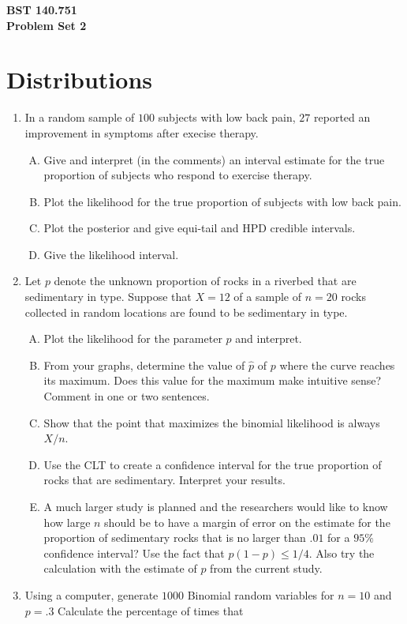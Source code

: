 \documentclass[12pt]{article}
\begin{document}
\noindent
{\bf BST 140.751 \\ Problem Set 2} \\
\section{Distributions}
\begin{enumerate}[1.]
\item In a random sample of $100$ subjects with low back pain, $27$
  reported an improvement in symptoms after execise therapy. 
  \begin{enumerate}[A.]
  \item Give and interpret (in the comments) an interval estimate for the true
    proportion of subjects who respond to exercise therapy.
  \item Plot the likelihood for the true proportion of subjects with low back pain.
  \item Plot the posterior and give equi-tail and HPD credible intervals.
  \item Give the likelihood interval.
  \end{enumerate}
\item  Let $p$ denote the unknown proportion of rocks in a riverbed
  that are sedimentary in type.  Suppose that $X = 12$ of a sample of
  $n = 20$ rocks collected in random locations are found to be
  sedimentary in type.
\begin{enumerate}[A.]
\item Plot the likelihood for the parameter $p$ and interpret.
\item From your graphs, determine the value of $\hat{p}$ of $p$ where
  the curve reaches its maximum.  Does this value for the maximum make
 intuitive sense?  Comment in one or two sentences.
\item Show that the point that maximizes the binomial likelihood is always $X/n$.
\item Use the CLT to create a confidence interval for the true
  proportion of rocks that are sedimentary. Interpret your results.
\item A much larger study is planned and the researchers would like to
  know how large $n$ should be to have a margin of error on the
  estimate for the proportion of sedimentary rocks that is no larger
  than $.01$ for a $95\%$ confidence interval? Use the fact that $p(1
  - p) \leq 1/4$. Also try the calculation with the estimate of $p$
  from the current study.
\end{enumerate}
\item Using a computer, generate $1000$ Binomial random variables for $n=10$ and $p =.3$ Calculate the percentage of times that 

\end{enumerate}
\end{document}

